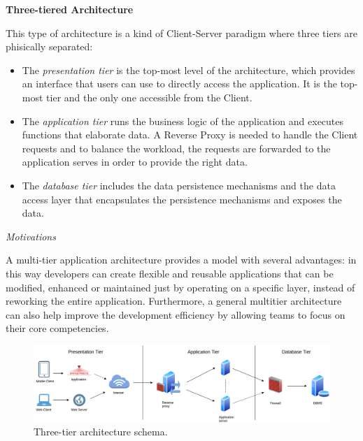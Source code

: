 \documentclass{report}
\begin{document}
\vspace{2mm}
\begin{center}\large{\textbf{Three-tiered Architecture}}\end{center}
This type of architecture is a kind of Client-Server paradigm where three tiers are phisically separated:
\begin{itemize}
	\item The \textit{presentation tier} is the top-most level of the architecture, which provides an interface that users can use to directly access the application. 
	It is the top-most tier and the only one accessible from the Client.
	\item The \textit{application tier} runs the business logic of the application and executes functions that elaborate data. 
	A Reverse Proxy is needed to handle the Client requests and to balance the workload, the requests are forwarded to 
	the application serves in order to provide the right data.
	\item The \textit{database tier} includes the data persistence mechanisms and the data access layer that encapsulates 
	the persistence mechanisms and exposes the data.
\end{itemize}
\begin{center}\large{\textit{Motivations}}\end{center}
A multi-tier application architecture provides a model with several advantages: in this way developers can create flexible and reusable 
applications that can be modified, enhanced or maintained just by operating on a specific layer, instead of reworking the entire application. Furthermore, a general multitier architecture can also help improve the development efficiency by allowing teams to focus on their core competencies.

\begin{figure}[!ht]
	\begin{center}
	\includegraphics[width=\textwidth]{img/TiersArchitecture.png}
	\end{center}
	\caption{Three-tier architecture schema.}
\end{figure}
\end{document}
